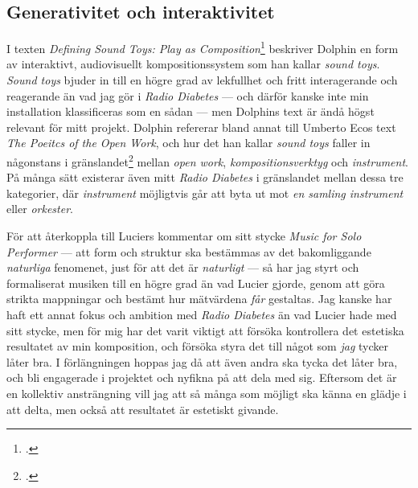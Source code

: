 \documentclass[11pt, a4paper]{article} %
\begin{document}
\subsection*{Generativitet och interaktivitet}
I texten \emph{Defining Sound Toys: Play as Composition}\footcite{collins_defining_2014} beskriver Dolphin en form av interaktivt, audiovisuellt kompositionssystem som han kallar \emph{sound toys}. \emph{Sound toys} bjuder in till en högre grad av lekfullhet och fritt interagerande och reagerande än vad jag gör i \emph{Radio Diabetes} --- och därför kanske inte min installation klassificeras som en sådan --- men Dolphins text är ändå högst relevant för mitt projekt. Dolphin refererar bland annat till Umberto Ecos text \emph{The Poeitcs of the Open Work}, och hur det han kallar \emph{sound toys} faller in någonstans i gränslandet\footcite[53]{collins_defining_2014} mellan \emph{open work}, \emph{kompositionsverktyg} och \emph{instrument}. På många sätt existerar även mitt \emph{Radio Diabetes} i gränslandet mellan dessa tre kategorier, där \emph{instrument} möjligtvis går att byta ut mot \emph{en samling instrument} eller \emph{orkester}. 

För att återkoppla till Luciers kommentar om sitt stycke \emph{Music for Solo Performer} --- att form och struktur ska bestämmas av det bakomliggande \emph{naturliga} fenomenet, just för att det är \emph{naturligt} --- så har jag styrt och formaliserat musiken till en högre grad än vad Lucier gjorde, genom att göra strikta mappningar och bestämt hur mätvärdena \emph{får} gestaltas. Jag kanske har haft ett annat fokus och ambition med \emph{Radio Diabetes} än vad Lucier hade med sitt stycke, men för mig har det varit viktigt att försöka kontrollera det estetiska resultatet av min komposition, och försöka styra det till något som \emph{jag} tycker låter bra. I förlängningen hoppas jag då att även andra ska tycka det låter bra, och bli engagerade i projektet och nyfikna på att dela med sig. Eftersom det är en kollektiv ansträngning vill jag att så många som möjligt ska känna en glädje i att delta, men också att resultatet är estetiskt givande. %
\end{document}
